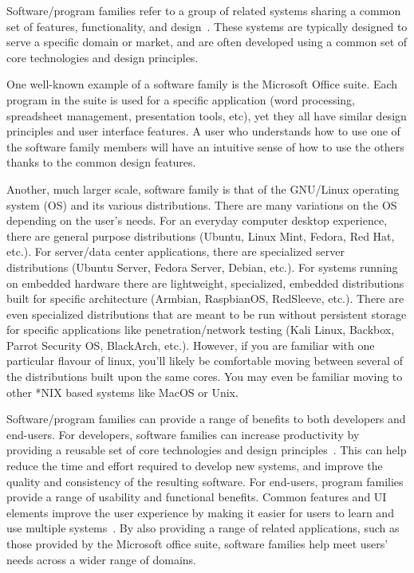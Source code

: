 Software/program families refer to a group of related systems sharing a common 
set of features, functionality, and design~\cite{Pohl2005}. These systems are 
typically designed to serve a specific domain or market, and are often 
developed using a common set of core technologies and design principles.

One well-known example of a software family is the Microsoft Office suite. Each 
program in the suite is used for a specific application (word 
processing, spreadsheet management, presentation tools, etc), yet they all have 
similar design principles and user interface features. A user who understands 
how to use one of the software family members will have an intuitive sense of 
how to use the others thanks to the common design features. 

Another, much larger scale, software family is that of the GNU/Linux operating 
system (OS) and its various distributions. There are many variations on the OS 
depending on the user's needs. For an everyday computer desktop experience, 
there are general purpose distributions (Ubuntu, Linux Mint, Fedora, Red 
Hat, etc.). For server/data center applications, there are specialized server 
distributions (Ubuntu Server, Fedora Server, Debian, etc.). For systems running 
on embedded hardware there are lightweight, specialized, embedded distributions 
built for specific architecture (Armbian, RaspbianOS, RedSleeve, etc.). There 
are even specialized distributions that are meant to be run without persistent 
storage for specific applications like penetration/network testing (Kali Linux, 
Backbox, Parrot Security OS, BlackArch, etc.). However, if you are familiar 
with one particular flavour of linux, you'll likely be comfortable moving 
between several of the distributions built upon the same cores. You may even be 
familiar moving to other *NIX based systems like MacOS or Unix.

Software/program families can provide a range of benefits to both developers 
and end-users. For developers, software families can increase 
productivity by providing a reusable set of core technologies and design 
principles~\cite{Pohl2005}. This can help reduce the time and effort required 
to develop new systems, and improve the quality and consistency of the 
resulting software. For end-users, program families provide a range of 
usability and functional benefits. Common features and UI elements improve the 
user experience by making it easier for users to learn and use multiple 
systems~\cite{Bosch2000}. By also providing a range of related 
applications, such as those provided by the Microsoft office suite, software 
families help meet users' needs across a wider range of domains.

